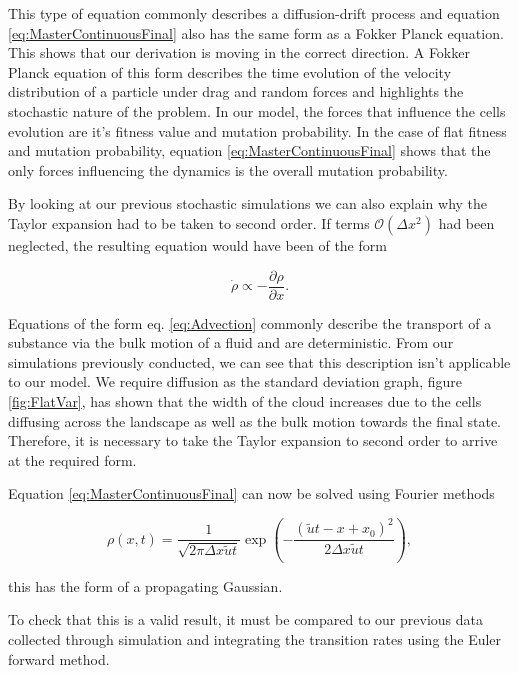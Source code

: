 \documentclass[12pt, a4paper,]{article}
\begin{document}
This type of equation commonly describes a diffusion-drift process and equation \eqref{eq:MasterContinuousFinal} also has the same form as a Fokker Planck equation. This shows that our derivation is moving in the correct direction. A Fokker Planck equation of this form describes the time evolution of the velocity distribution of a particle under drag and random forces and highlights the stochastic nature of the problem. In our model, the forces that influence the cells evolution are it's fitness value and mutation probability. In the case of flat fitness and mutation probability, equation \eqref{eq:MasterContinuousFinal} shows that the only forces influencing the dynamics is the overall mutation probability. 

By looking at our previous stochastic simulations we can also explain why the Taylor expansion had to be taken to second order. 
If terms $\mathcal{O} (\Delta x^2) $ had been neglected, the resulting equation would have been of the form 

\begin{equation}
\dot{\rho} \propto - \frac{\partial \rho }{\partial x}. 
\label{eq:Advection}
\end{equation}
 
Equations of the form eq. \eqref{eq:Advection} commonly describe the transport of a substance via the bulk motion of a fluid and are deterministic. From our simulations previously conducted, we can see that this description isn't applicable to our model. We require diffusion as the standard deviation graph, figure \ref{fig:FlatVar}, has shown that the width of the cloud increases due to the cells diffusing across the landscape as well as the bulk motion towards the final state. Therefore, it is necessary to take the Taylor expansion to second order to arrive at the required form. 

Equation \eqref{eq:MasterContinuousFinal} can now be solved using Fourier methods 

\begin{equation}
\rho (x,t) = \frac{1}{\sqrt{2 \pi \Delta x \tilde{u} t}} \exp \left(- \frac{(\tilde{u}t - x + x_0 )^2}{2 \Delta x \tilde{u} t} \right),
\label{eq:AnalyticSolution}
\end{equation}

this has the form of a propagating Gaussian. 

To check that this is a valid result, it must be compared to our previous data collected through simulation and integrating the transition rates using the Euler forward method. 
\end{document}
